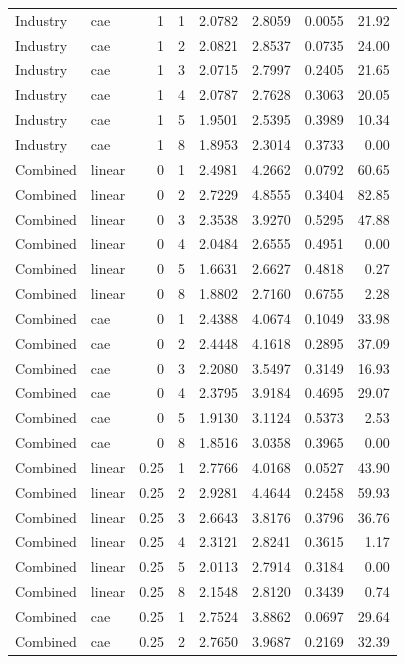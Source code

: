 \begin{longtable}{llrrrrrr}
Industry & cae & 1 & 1 & 2.0782 & 2.8059 & 0.0055 & 21.92 \\
Industry & cae & 1 & 2 & 2.0821 & 2.8537 & 0.0735 & 24.00 \\
Industry & cae & 1 & 3 & 2.0715 & 2.7997 & 0.2405 & 21.65 \\
Industry & cae & 1 & 4 & 2.0787 & 2.7628 & 0.3063 & 20.05 \\
Industry & cae & 1 & 5 & 1.9501 & 2.5395 & 0.3989 & 10.34 \\
Industry & cae & 1 & 8 & 1.8953 & 2.3014 & 0.3733 & 0.00 \\
Combined & linear & 0 & 1 & 2.4981 & 4.2662 & 0.0792 & 60.65 \\
Combined & linear & 0 & 2 & 2.7229 & 4.8555 & 0.3404 & 82.85 \\
Combined & linear & 0 & 3 & 2.3538 & 3.9270 & 0.5295 & 47.88 \\
Combined & linear & 0 & 4 & 2.0484 & 2.6555 & 0.4951 & 0.00 \\
Combined & linear & 0 & 5 & 1.6631 & 2.6627 & 0.4818 & 0.27 \\
Combined & linear & 0 & 8 & 1.8802 & 2.7160 & 0.6755 & 2.28 \\
Combined & cae & 0 & 1 & 2.4388 & 4.0674 & 0.1049 & 33.98 \\
Combined & cae & 0 & 2 & 2.4448 & 4.1618 & 0.2895 & 37.09 \\
Combined & cae & 0 & 3 & 2.2080 & 3.5497 & 0.3149 & 16.93 \\
Combined & cae & 0 & 4 & 2.3795 & 3.9184 & 0.4695 & 29.07 \\
Combined & cae & 0 & 5 & 1.9130 & 3.1124 & 0.5373 & 2.53 \\
Combined & cae & 0 & 8 & 1.8516 & 3.0358 & 0.3965 & 0.00 \\
Combined & linear & 0.25 & 1 & 2.7766 & 4.0168 & 0.0527 & 43.90 \\
Combined & linear & 0.25 & 2 & 2.9281 & 4.4644 & 0.2458 & 59.93 \\
Combined & linear & 0.25 & 3 & 2.6643 & 3.8176 & 0.3796 & 36.76 \\
Combined & linear & 0.25 & 4 & 2.3121 & 2.8241 & 0.3615 & 1.17 \\
Combined & linear & 0.25 & 5 & 2.0113 & 2.7914 & 0.3184 & 0.00 \\
Combined & linear & 0.25 & 8 & 2.1548 & 2.8120 & 0.3439 & 0.74 \\
Combined & cae & 0.25 & 1 & 2.7524 & 3.8862 & 0.0697 & 29.64 \\
Combined & cae & 0.25 & 2 & 2.7650 & 3.9687 & 0.2169 & 32.39 \\

\end{longtable}
